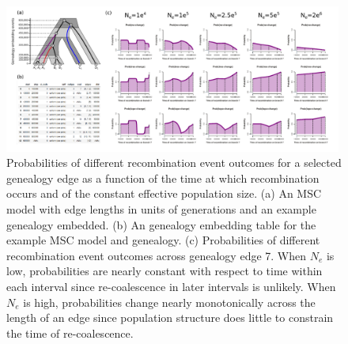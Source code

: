 \documentclass[11pt]{article}
\begin{document}
\begin{figure}[p]
	\centering
	\includegraphics[width=0.99\textwidth]{figures/Fig-S2-edge-probabilities.pdf}	
	\caption{
		Probabilities of different recombination event outcomes for a selected 
		genealogy edge as a function of the time at which recombination occurs 
		and of the constant effective population size.
		(a) An MSC model with edge lengths in units of generations and an example
		genealogy embedded. (b) An genealogy embedding table for the example MSC
		model and genealogy. (c) Probabilities of different recombination event
		outcomes across genealogy edge 7. When $N_e$ is low, probabilities are 
		nearly constant with respect to time within each interval since re-coalescence in later intervals
		is unlikely. When $N_e$ is high, probabilities change nearly monotonically 
		across the length of an edge since population structure does little
		to constrain the time of re-coalescence.
	}
     \label{fig:figS-edge-probabilities}
\end{figure}
\end{document}
